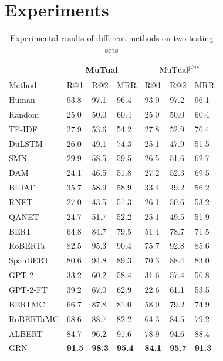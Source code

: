 \documentclass[letterpaper]{article}
\begin{document}
\section{Experiments}
\begin{table}[t]
\centering
\begin{tabular}{p{1.9cm}|p{0.6cm}|p{0.6cm}|p{0.6cm}|p{0.6cm}|p{0.6cm}|p{0.6cm}}  %
\hline
   & \multicolumn{3}{c|}{MuTual} & \multicolumn{3}{c}{$ \text{MuTual}^{plus}$} \\ \hline
   Method & R@1 &R@2 & MRR & R@1 &R@2 & MRR \\ \hline
   Human & 93.8 & 97.1 & 96.4  & 93.0 & 97.2 & 96.1 \\ \hline
   Random  & 25.0 & 50.0 & 60.4 & 25.0 & 50.0 & 60.4  \\ \hline
   TF-IDF & 27.9 & 53.6 & 54.2 & 27.8 & 52.9 & 76.4  \\
   DuLSTM & 26.0 & 49.1 & 74.3 & 25.1 & 47.9 & 51.5  \\
   SMN & 29.9 & 58.5 & 59.5 & 26.5 & 51.6 & 62.7 \\
   DAM & 24.1 & 46.5 & 51.8 & 27.2 & 52.3 & 69.5  \\ \hline
   BIDAF & 35.7 & 58.9 &58.9 & 33.4 & 49.2 & 56.2 \\
   RNET & 27.0 & 43.5 & 51.3 & 26.1 & 50.6 & 53.2 \\
   QANET &24.7 &51.7  & 52.2 & 25.1 & 49.5 & 51.9 \\ \hline
   BERT  & 64.8 & 84.7 & 79.5 &  51.4 & 78.7 & 71.5 \\
   RoBERTa & 82.5 & 95.3 & 90.4 & 75.7 & 92.8 & 85.6\\
   SpanBERT & 80.6 & 94.8 & 89.3 & 70.3 & 88.4 & 83.0\\
   GPT-2 & 33.2 & 60.2 & 58.4  & 31.6 & 57.4 & 56.8  \\
   GPT-2-FT  & 39.2 & 67.0 & 62.9 & 22.6 & 61.1 & 53.5  \\
   BERTMC  & 66.7 & 87.8 & 81.0 & 58.0 & 79.2 & 74.9 \\
   RoBERTaMC & 68.6 & 88.7 & 82.2 & 64.3 & 84.5 & 79.2  \\
   ALBERT & 84.7 & 96.2 & 91.6 &  78.9 & 94.6 & 88.4 \\ \hline
   GRN  & \textbf{91.5} & \textbf{98.3} & \textbf{95.4} & \textbf{84.1} & \textbf{95.7} & \textbf{91.3} \\ \hline
\end{tabular}
\caption{Experimental results of different methods on two testing sets}
\label{compared_results}
\end{table}
\end{document}
